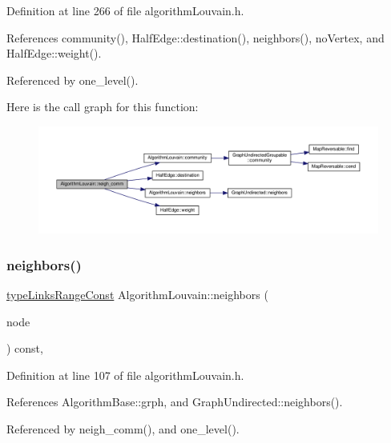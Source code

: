 Definition at line 266 of file algorithm\+Louvain.\+h.



References community(), Half\+Edge\+::destination(), neighbors(), no\+Vertex, and Half\+Edge\+::weight().



Referenced by one\+\_\+level().

Here is the call graph for this function\+:
\nopagebreak
\begin{figure}[H]
\begin{center}
\leavevmode
\includegraphics[width=350pt]{classAlgorithmLouvain_a78dfa81bd96f4036e44c17318501b6b7_cgraph}
\end{center}
\end{figure}
\mbox{\label{classAlgorithmLouvain_a46c54a194acf1a09debfaf3f67d84f85}} 
\subsubsection{\texorpdfstring{neighbors()}{neighbors()}}
{\footnotesize\ttfamily \hyperlink{graphInterface_8h_ae8d27008f15586bbf419af7ad2e0a48a}{type\+Links\+Range\+Const} Algorithm\+Louvain\+::neighbors (\begin{DoxyParamCaption}\item[{const \hyperlink{edge_8h_a5fbd20c46956d479cb10afc9855223f6}{type\+Vertex} \&}]{node }\end{DoxyParamCaption}) const\hspace{0.3cm}{\ttfamily [inline]}, {\ttfamily [private]}}



Definition at line 107 of file algorithm\+Louvain.\+h.



References Algorithm\+Base\+::grph, and Graph\+Undirected\+::neighbors().



Referenced by neigh\+\_\+comm(), and one\+\_\+level().


